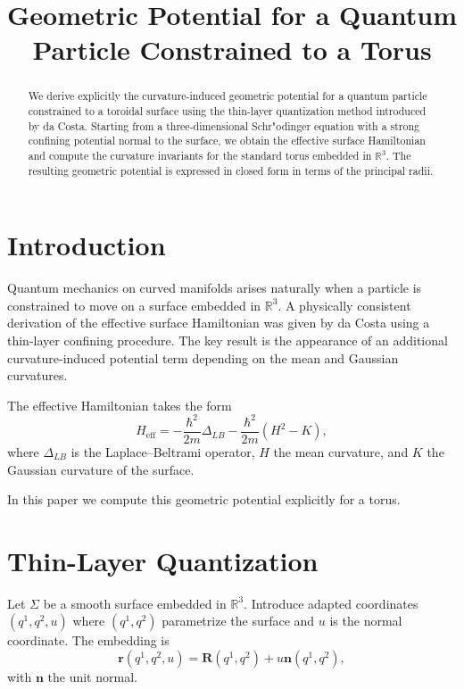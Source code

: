 \documentclass[11pt]{article}
\title{Geometric Potential for a Quantum Particle Constrained to a Torus}
\author{}
\date{}
\begin{document}
\maketitle

\begin{abstract}
We derive explicitly the curvature-induced geometric potential for a quantum particle constrained to a toroidal surface using the thin-layer quantization method introduced by da Costa. Starting from a three-dimensional Schr"odinger equation with a strong confining potential normal to the surface, we obtain the effective surface Hamiltonian and compute the curvature invariants for the standard torus embedded in $\mathbb{R}^3$. The resulting geometric potential is expressed in closed form in terms of the principal radii.
\end{abstract}

\section{Introduction}

Quantum mechanics on curved manifolds arises naturally when a particle is constrained to move on a surface embedded in $\mathbb{R}^3$. A physically consistent derivation of the effective surface Hamiltonian was given by da Costa using a thin-layer confining procedure. The key result is the appearance of an additional curvature-induced potential term depending on the mean and Gaussian curvatures.

The effective Hamiltonian takes the form
\begin{equation}
H_{\text{eff}} = -\frac{\hbar^2}{2m}\Delta_{LB} - \frac{\hbar^2}{2m}(H^2 - K),
\end{equation}
where $\Delta_{LB}$ is the Laplace--Beltrami operator, $H$ the mean curvature, and $K$ the Gaussian curvature of the surface.

In this paper we compute this geometric potential explicitly for a torus.

\section{Thin-Layer Quantization}

Let $\Sigma$ be a smooth surface embedded in $\mathbb{R}^3$. Introduce adapted coordinates $(q^1,q^2,u)$ where $(q^1,q^2)$ parametrize the surface and $u$ is the normal coordinate. The embedding is
\begin{equation}
\mathbf{r}(q^1,q^2,u) = \mathbf{R}(q^1,q^2) + u \mathbf{n}(q^1,q^2),
\end{equation}
with $\mathbf{n}$ the unit normal.
\end{document}
